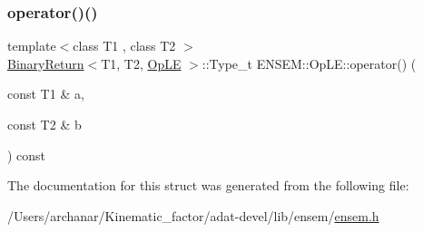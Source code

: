 \subsubsection{\texorpdfstring{operator()()}{operator()()}\hspace{0.1cm}{\footnotesize\ttfamily [3/3]}}
{\footnotesize\ttfamily template$<$class T1 , class T2 $>$ \\
\mbox{\hyperlink{structENSEM_1_1BinaryReturn}{Binary\+Return}}$<$T1, T2, \mbox{\hyperlink{structENSEM_1_1OpLE}{Op\+LE}} $>$\+::Type\+\_\+t E\+N\+S\+E\+M\+::\+Op\+L\+E\+::operator() (\begin{DoxyParamCaption}\item[{const T1 \&}]{a,  }\item[{const T2 \&}]{b }\end{DoxyParamCaption}) const\hspace{0.3cm}{\ttfamily [inline]}}



The documentation for this struct was generated from the following file\+:\begin{DoxyCompactItemize}
\item 
/\+Users/archanar/\+Kinematic\+\_\+factor/adat-\/devel/lib/ensem/\mbox{\hyperlink{adat-devel_2lib_2ensem_2ensem_8h}{ensem.\+h}}\end{DoxyCompactItemize}

